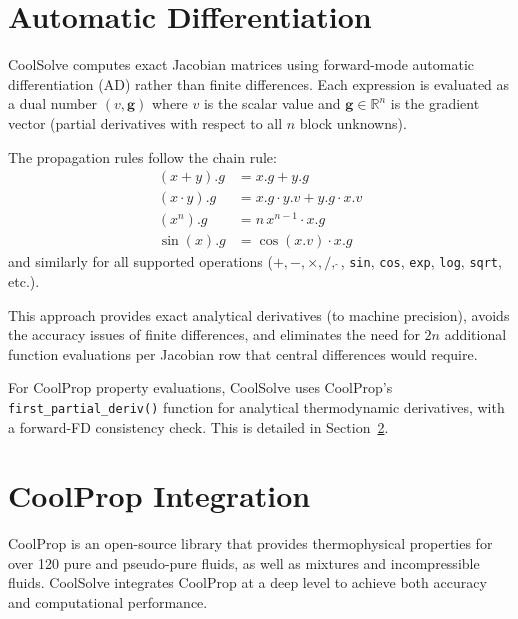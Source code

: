 \documentclass[review,3p]{elsarticle}
\begin{document}
\section{Automatic Differentiation}
\label{sec:ad}

CoolSolve computes exact Jacobian matrices using forward-mode automatic differentiation (AD) rather than finite differences. Each expression is evaluated as a dual number $(v, \mathbf{g})$ where $v$ is the scalar value and $\mathbf{g} \in \mathbb{R}^n$ is the gradient vector (partial derivatives with respect to all $n$ block unknowns).

The propagation rules follow the chain rule:
\begin{align}
    (x + y).g &= x.g + y.g \\
    (x \cdot y).g &= x.g \cdot y.v + y.g \cdot x.v \\
    (x^n).g &= n \, x^{n-1} \cdot x.g \\
    \sin(x).g &= \cos(x.v) \cdot x.g
\end{align}
and similarly for all supported operations ($+, -, \times, /, \hat{\ }$, \texttt{sin}, \texttt{cos}, \texttt{exp}, \texttt{log}, \texttt{sqrt}, etc.).

This approach provides exact analytical derivatives (to machine precision), avoids the accuracy issues of finite differences, and eliminates the need for $2n$ additional function evaluations per Jacobian row that central differences would require.

For CoolProp property evaluations, CoolSolve uses CoolProp's \texttt{first\_partial\_deriv()} function for analytical thermodynamic derivatives, with a forward-FD consistency check. This is detailed in Section~\ref{sec:coolprop}.

\section{CoolProp Integration}
\label{sec:coolprop}

CoolProp \cite{Bell2014} is an open-source library that provides thermophysical properties for over 120 pure and pseudo-pure fluids, as well as mixtures and incompressible fluids. CoolSolve integrates CoolProp at a deep level to achieve both accuracy and computational performance.
\end{document}

